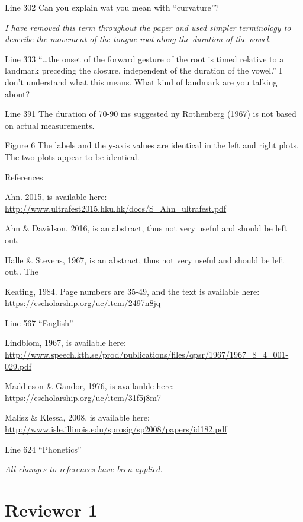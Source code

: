 \documentclass[]{article}
\begin{document}
Line 302 Can you explain wat you mean with ``curvature''?

\begin{adjustwidth}{1cm}{} \textit{
I have removed this term throughout the paper and used simpler terminology to describe the movement of the tongue root along the duration of the vowel.
} \end{adjustwidth}

Line 333 ``\ldots{}the onset of the forward gesture of the root is timed
relative to a landmark preceding the closure, independent of the
duration of the vowel.'' I don't understand what this means. What kind
of landmark are you talking about?

Line 391 The duration of 70-90 ms suggested ny Rothenberg (1967) is not
based on actual measurements.

Figure 6 The labels and the y-axis values are identical in the left and
right plots. The two plots appear to be identical.

References

Ahn. 2015, is available here:
\url{http://www.ultrafest2015.hku.hk/docs/S_Ahn_ultrafest.pdf}

Ahn \& Davidson, 2016, is an abstract, thus not very useful and should
be left out.

Halle \& Stevens, 1967, is an abstract, thus not very useful and should
be left out,. The

Keating, 1984. Page numbers are 35-49, and the text is available here:
\url{https://escholarship.org/uc/item/2497n8jq}

Line 567 ``English''

Lindblom, 1967, is available here:
\url{http://www.speech.kth.se/prod/publications/files/qpsr/1967/1967_8_4_001-029.pdf}

Maddieson \& Gandor, 1976, is availanlde here:
\url{https://escholarship.org/uc/item/31f5j8m7}

Malisz \& Klessa, 2008, is available here:
\url{http://www.isle.illinois.edu/sprosig/sp2008/papers/id182.pdf}

Line 624 ``Phonetics''

\begin{adjustwidth}{1cm}{} \textit{
All changes to references have been applied.
} \end{adjustwidth}

\hypertarget{reviewer-1}{%
\section{Reviewer 1}\label{reviewer-1}}
\end{document}
